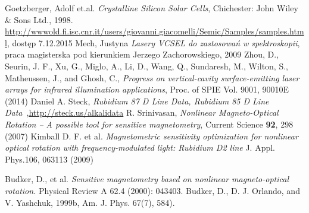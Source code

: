 \documentclass[a4paper,10pt]{article}
\begin{document}
\begin{thebibliography}{99}
 Goetzberger, Adolf et.al. \emph{Crystalline Silicon Solar Cells}, Chichester: John Wiley \& Sons Ltd., 1998.
 \url{http://wwwold.fi.isc.cnr.it/users/giovanni.giacomelli/Semic/Samples/samples.html}, dostęp 7.12.2015
  Mech, Justyna \emph{Lasery VCSEL do zastosowań w spektroskopii}, praca magisterska pod kierunkiem Jerzego Zachorowskiego, 2009
 Zhou, D., Seurin, J. F., Xu, G., Miglo, A., Li, D., Wang, Q., Sundaresh, M., Wilton, S., Matheussen, J., and  Ghosh, C., \emph{Progress on vertical-cavity surface-emitting laser arrays for infrared illumination applications},  Proc. of SPIE Vol. 9001, 90010E (2014)
 Daniel A. Steck, \emph{Rubidium 87 D Line Data, Rubidium 85 D Line Data}~,\url{http://steck.us/alkalidata}
 R. Srinivasan,\textit{ Nonlinear Magneto-Optical Rotation – A possible tool for sensitive magnetometry}, Current Science \textbf{92}, 298 (2007)
 Kimball D. F. et al.  \emph{Magnetometric sensitivity optimization for nonlinear optical rotation with
frequency-modulated light: Rubidium D2 line} J. Appl. Phys.106, 063113 (2009)


 Budker, D., et al. \emph{Sensitive magnetometry based on nonlinear magneto-optical rotation.} Physical Review A 62.4 (2000): 043403.
 Budker, D., D. J. Orlando, and V. Yashchuk, 1999b, Am. J. Phys. 67(7), 584).

\end{thebibliography}
\end{document}
